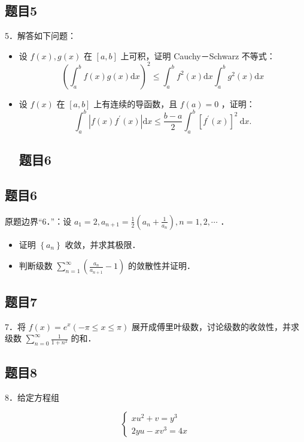 \documentclass{article}
\begin{document}
\subsection{题目5}
5．解答如下问题：

\begin{itemize}
  \item[（1）] 设 \(f(x), g(x)\) 在 \([a, b]\) 上可积，证明 Cauchy－Schwarz 不等式：
\[
\left(\int_{a}^{b} f(x) g(x) \mathrm{d} x\right)^{2} \leq \int_{a}^{b} f^{2}(x) \mathrm{d} x \int_{a}^{b} g^{2}(x) \mathrm{d} x
\]
  \item[（2）] 设 \(f(x)\) 在 \([a, b]\) 上有连续的导函数，且 \(f(a)=0\) ，证明：
\[
\int_{a}^{b}\left|f(x) f^{\prime}(x)\right| \mathrm{d} x \leq \frac{b-a}{2} \int_{a}^{b}\left[f^{\prime}(x)\right]^{2} \mathrm{~d} x .
\]

\subsection{题目6}
\end{itemize}

\subsection{题目6}
原题边界“6．”：设 \(a_{1}=2, a_{n+1}=\frac{1}{2}\left(a_{n}+\frac{1}{a_{n}}\right), n=1,2, \cdots\) ．

\begin{itemize}
\item[（1）] 证明 \(\left\{a_{n}\right\}\) 收敛，并求其极限．
  \item[（2）] 判断级数 \(\sum_{n=1}^{\infty}\left(\frac{a_{n}}{a_{n+1}}-1\right)\) 的敛散性并证明．
\end{itemize}

\subsection{题目7}
7．将 \(f(x)=e^{x}(-\pi \leq x \leq \pi)\) 展开成傅里叶级数，讨论级数的收敛性，并求级数 \(\sum_{n=0}^{\infty} \frac{1}{1+n^{2}}\) 的和．

\subsection{题目8}
8．给定方程组

\[
\left\{\begin{array}{l}
x u^{2}+v=y^{3} \\
2 y u-x v^{3}=4 x
\end{array}\right.
\]
\end{document}
